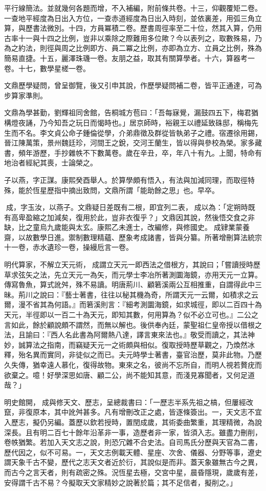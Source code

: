 \begin{pinyinscope}
平行線簡法。並就幾何各題而增，不入補編，附前條共卷。十三，仰觀覆矩二卷。一查地平經度為日出入方位，一查赤道經度為日出入時刻，並依裏差，用弧三角立算，與歷書法微別。十四，方員冪積二卷。歷書周徑率至二十位，然其入算，仍用古率十一與十四之比例，豈非以乘除之際難用多位歟？今以表列之，取數殊易，乃為之約法，則徑與周之比例即方、員二冪之比例，亦即為立方、立員之比例，殊為簡易直捷。十五，麗澤珠璣一卷。友朋之益，取其有關算學者。十六，算器考一卷。十七，數學星槎一卷。

文鼎歷學疑問，曾呈御覽，後又引申其說，作歷學疑問補二卷，皆平正通達，可為步算家準則。

文鼎為學甚勤，劉輝祖同舍館，告桐城方苞曰：「吾每寐覺，漏鼓四五下，梅君猶構燈夜誦，乃今知吾之玩日而愒時也。」居京師時，裕親王以禮延致硃邸，稱梅先生而不名。李文貞公命子鍾倫從學，介弟鼎徵及群從皆執弟子之禮。宿遷徐用錫，晉江陳萬策，景州魏廷珍，河間王之銳，交河王蘭生，皆以得與參校為榮。家多藏書，頻年游歷，手抄雜帙不下數萬卷。歲在辛丑，卒，年八十有九。上聞，特命有地治者經紀其喪，士論榮之。

子以燕，字正謀。康熙癸酉舉人。於算學頗有悟入，有法與加減同理，而取徑特殊，能於恆星歷指中摘出致問，文鼎所謂「能助餘之思」也。早卒。

成，字玉汝，以燕子。文鼎疑日差既有二根，即宜列二表，成以為：「定朔時既有高卑盈縮之加減矣，復用於此，豈非衣復乎？」文鼎因其說，然後悟交食之非缺，比之童烏九歲能與太玄。康熙乙未進士，改編修，與修國史。成肄業蒙養齋，以故數學日進。禦制數理精蘊、歷象考成諸書，皆與分纂。所著增刪算法統宗十一卷，赤水遺珍一卷，操縵卮言一卷。

明代算家，不解立天元術，成謂立天元一即西法之借根方，其說曰；「嘗讀授時歷草求弦矢之法，先立天元一為矢，而元學士李冶所著測圜海鏡，亦用天元一立算。傳寫魯魚，算式訛舛，殊不易讀。明唐荊川、顧箬溪兩公互相推重，自謂得此中三昧。荊川之說曰：『藝士著書，往往以秘其機為奇，所謂天元一云爾，如積求之云爾，漫不省其為何語。』而箬溪則言：『細考測圜海鏡，如求城徑，即以二百四十為天元，半徑即以一百二十為天元，即知其數，何用算為？似不必立可也。』二公之言如此，餘於顧說頗不謂然，而無以解也。後供奉內廷，蒙聖祖仁皇帝授以借根之法，且諭曰：『西人名此書為阿爾熱八達，譯言東來法也。』敬受而讀之，其法神妙，誠算法之指南，而竊疑天元一之術頗與相似。復取授時歷草觀之，乃煥然冰釋，殆名異而實同，非徒似之而已。夫元時學士著書，臺官治歷，莫非此物。乃歷久失傳，猶幸遠人慕化，復得故物。東來之名，彼尚不忘所自，而明人視若贅疣而欲棄之。噫！好學深思如唐、顧二公，尚不能知其意，而淺見寡聞者，又何足道哉？」

明史館開，成與修天文、歷志，呈總裁書曰：「一歷志半系先祖之槁，但屢經改竄，非復原本，其中訛舛甚多。凡有增刪改正之處，皆逐條簽出。一，天文志不宜入歷志，擬仍另編。蓋歷以欽若授時，置閏成歲，其術委曲繁重，其理精微，為說深長。且有明二百七十餘年沿革非一事，造歷者非一家，皆須入志。雖盡力刪削，卷帙猶繁。若加入天文志之說，則恐冗雜不合史法。自司馬氏分歷與天官為二書，歷代因之，似不可易。一，天文志例載天體、星座、次舍、儀器、分野等事，遼史謂天象千古不變，歷代之志天文者近於衍，其說似是而非。蓋天象雖無古今之異，而古今之言天者，則有疏密之殊。況恆星去極，交宮中星，晨昏隱現，歲歲有差，安得謂千古不易？今擬取天文家精妙之說著於篇；其不足信者，擬削之。」


\end{pinyinscope}

